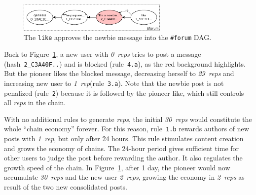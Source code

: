 \documentclass[12pt]{article}
\newcommand{\reps}     {\emph{reps}\xspace}
\newcommand{\onerep}   {\emph{1~rep}\xspace}
\newcommand{\nreps}[1] {\emph{#1~reps\xspace}}
\newcommand{\code}[1]  {\texttt{\footnotesize{#1}}}
\begin{document}
\begin{figure}
\centering
\includegraphics[width=0.65\textwidth]{forum.png}
\caption{
    The \code{like} approves the newbie message into the \code{\#forum} DAG.
}
\label{fig.forum}
\end{figure}

Back to Figure~\ref{fig.forum}, a new user with \nreps{0} tries to post a
message (hash~\code{2\_C3A40F..}) and is blocked (rule~\code{4.a}), as the red
background highlights.
But the pioneer likes the blocked message, decreasing herself to \nreps{29}
and increasing new user to \onerep (rule~\code{3.a}).
Note that the newbie post is not penalized (rule~\code{2}) because it is
followed by the pioneer like, which still controls all \reps in the chain.

With no additional rules to generate \reps, the initial \nreps{30} would
constitute the whole ``chain economy'' forever.
For this reason, rule~\code{1.b} rewards authors of new posts with \onerep,
but only after 24 hours.
This rule stimulates content creation and grows the economy of chains.
The 24-hour period gives sufficient time for other users to judge the post
before rewarding the author.
It also regulates the growth speed of the chain.
In Figure~\ref{fig.forum}, after 1 day, the pioneer would now accumulate
\nreps{30} and the new user \nreps{2}, growing the economy in \nreps{2} as
result of the two new consolidated posts.
\end{document}
